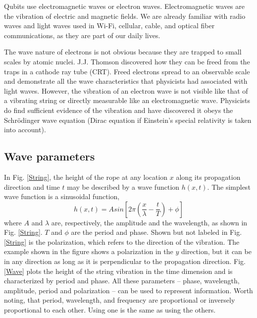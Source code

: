 \documentclass[oneside, letter, 12pt]{book}
\begin{document}
Qubits use electromagnetic waves or electron waves. Electromagnetic waves are the vibration of electric and magnetic fields. We are already familiar with radio waves and light waves used in Wi-Fi, cellular, cable, and optical fiber communications, as they are part of our daily lives.

The wave nature of electrons is not obvious because they are trapped to small scales by atomic nuclei. J.J. Thomson discovered how they can be freed from the traps\cite{THOMSON} in a cathode ray tube (CRT). Freed electrons spread to an observable scale and demonstrate all the wave characteristics that physicists had associated with light waves. However, the vibration of an electron wave is not visible like that of a vibrating string or directly measurable like an electromagnetic wave. Physicists do find sufficient evidence of the vibration and have discovered it obeys the Schrödinger wave equation (Dirac equation if Einstein's special relativity is taken into account).

\subsection{Wave parameters}
In Fig. \ref{String}, the height of the rope at any location $x$ along its propagation direction and time $t$ may be described by a wave function $h(x,t)$. The simplest wave function is a sinusoidal function,
\begin{equation}\label{e-hWave}
    h(x,t) = A sin[2\pi (\frac x \lambda - \frac t T) +\phi]
\end{equation}
where $A$ and $\lambda$ are, respectively, the amplitude and the wavelength, as shown in Fig. \ref{String}. $T$ and $\phi$ are the period and phase. Shown but not labeled in Fig. \ref{String} is the polarization, which refers to the direction of the vibration. The example shown in the figure shows a polarization in the $y$ direction, but it can be in any direction as long as it is perpendicular to the propagation direction. Fig. \ref{Wave} plots the height of the string vibration in the time dimension and is characterized by period and phase. All these parameters -- phase, wavelength, amplitude, period and polarization -- can be used to represent information. Worth noting, that period, wavelength, and frequency are proportional or inversely proportional to each other. Using one is the same as using the others.
\end{document}
